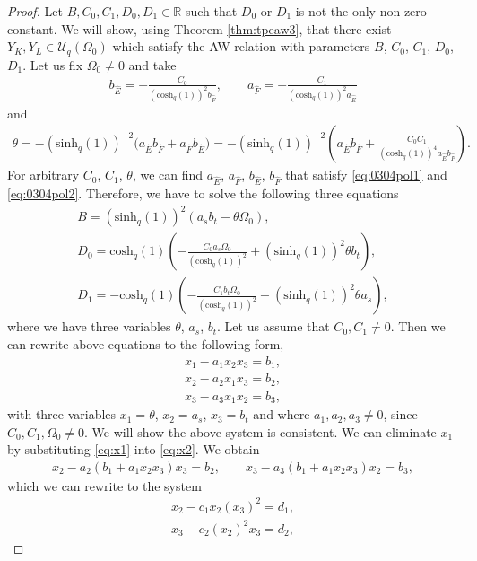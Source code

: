 \documentclass[pdftex]{sigma}
\numberwithin{equation}{section}
\newcommand{\RR}{\mathbb{R}}
\newcommand{\chq}{\mathrm{cosh}_q}
\newcommand{\shq}{\mathrm{sinh}_q}
\newcommand{\UqO}[1][q]{\mathcal{U}_{#1}\left(\Omega_0\right)}
\begin{document}
\begin{proof}
	Let $B,C_0,C_1,D_0,D_1\in\RR$ such that $D_0$ or $D_1$ is not the only non-zero constant. We will show, using Theorem \ref{thm:tpeaw3}, that there exist $Y_K,Y_L\in\UqO$ which satisfy the AW-relation with parameters $B$, $C_0$, $C_1$, $D_0$, $D_1$. Let us fix $\Omega_0\neq0$ and take
\begin{gather}
b_{\hat{E}}=-\frac{C_0}{(\chq(1))^2b_{\hat{F}}},\qquad a_{\hat{F}}=-\frac{C_1}{(\chq(1))^2a_{\hat{E}}}\label{eq:0304pol1}
\end{gather}
	and
	\begin{gather}\label{eq:0304pol2}
		\theta=-(\shq(1))^{-2}\big(a_{\hat{E}}b_{\hat{F}}+a_{\hat{F}}b_{\hat{E}}\big)=-(\shq(1))^{-2}\left( a_{\hat{E}}b_{\hat{F}}+ \frac{C_0C_1}{(\chq(1))^4a_{\hat{E}}b_{\hat{F}}}\right).
	\end{gather}
	For arbitrary $C_0$, $C_1$, $\theta$, we can find $a_{\hat{E}}$, $a_{\hat{F}}$, $b_{\hat{E}}$, $b_{\hat{F}}$ that satisfy \eqref{eq:0304pol1} and \eqref{eq:0304pol2}. Therefore, we have to solve the following three equations
	\begin{gather*}
B=(\shq(1))^2(a_s b_t-\theta\Omega_0),\\
D_0=\chq(1)\left(-\frac{C_0a_s\Omega_0}{(\chq(1))^2} +(\shq(1))^2\theta b_t\right),\\
D_1=-\chq(1)\left(-\frac{C_1b_t\Omega_0}{(\chq(1))^2} +(\shq(1))^2\theta a_s\right),
\end{gather*}
	where we have three variables $\theta$, $a_s$, $b_t$. Let us assume that $C_0,C_1\neq0$. Then we can rewrite above equations to the following form,
	\begin{gather}
x_1-a_1x_2x_3=b_1,\label{eq:x1}\\
x_2-a_2x_1x_3=b_2,\label{eq:x2}\\
x_3-a_3x_1x_2=b_3,\label{eq:x3}
	\end{gather}
	with three variables $x_1=\theta$, $x_2=a_s$, $x_3=b_t$ and where $a_1,a_2,a_3\neq0$, since $C_0,C_1,\Omega_0\neq0$. We will show the above system is consistent. We can eliminate $x_1$ by substituting \eqref{eq:x1} into \eqref{eq:x2}. We obtain
	\begin{gather*}
x_2-a_2(b_1+a_1x_2x_3)x_3=b_2,\qquad
x_3-a_3(b_1+a_1x_2x_3)x_2=b_3,
	\end{gather*}
which we can rewrite to the system
	\begin{gather}
x_2-c_1x_2(x_3)^2=d_1,\label{eq:system21}\\
x_3-c_2(x_2)^2x_3=d_2,\label{eq:system22}
	\end{gather}

\end{proof}
\end{document}
